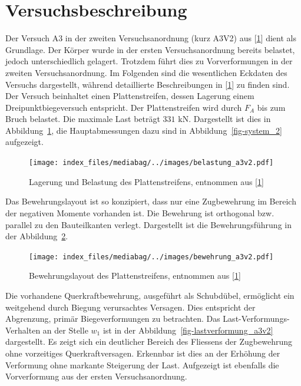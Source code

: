 \documentclass[
  12pt,
  letterpaper,
  egregdoesnotlikesansseriftitles]{scrreprt}
\begin{document}
\hypertarget{versuchsbeschreibung}{%
\section{Versuchsbeschreibung}\label{versuchsbeschreibung}}

Der Versuch A3 in der zweiten Versuchsanordnung (kurz A3V2) aus
{[}\protect\hyperlink{ref-Jaeger2006}{1}{]} dient als Grundlage. Der
Körper wurde in der ersten Versuchsanordnung bereits belastet, jedoch
unterschiedlich gelagert. Trotzdem führt dies zu Vorverformungen in der
zweiten Versuchsanordnung. Im Folgenden sind die wesentlichen Eckdaten
des Versuchs dargestellt, während detaillierte Beschreibungen in
{[}\protect\hyperlink{ref-Jaeger2006}{1}{]} zu finden sind. Der Versuch
beinhaltet einen Plattenstreifen, dessen Lagerung einem
Dreipunktbiegeversuch entspricht. Der Plattenstreifen wird durch \(F_A\)
bis zum Bruch belastet. Die maximale Last beträgt \(331 \text{ kN}\).
Dargestellt ist dies in Abbildung~\ref{fig-lagerung_a3v2}, die
Hauptabmessungen dazu sind in Abbildung~\ref{fig-system_2} aufgezeigt.

\begin{figure}[H]

{\centering \texttt{[image: index\_files/mediabag/../images/belastung\_a3v2.pdf]}

}

\caption{\label{fig-lagerung_a3v2}Lagerung und Belastung des
Plattenstreifens, entnommen aus
{[}\protect\hyperlink{ref-Jaeger2006}{1}{]}}

\end{figure}

Das Bewehrungslayout ist so konzipiert, dass nur eine Zugbewehrung im
Bereich der negativen Momente vorhanden ist. Die Bewehrung ist
orthogonal bzw. parallel zu den Bauteilkanten verlegt. Dargestellt ist
die Bewehrungsführung in der Abbildung~\ref{fig-bewehrung_a3v2}.

\begin{figure}[H]

{\centering \texttt{[image: index\_files/mediabag/../images/bewehrung\_a3v2.pdf]}

}

\caption{\label{fig-bewehrung_a3v2}Bewehrungslayout des
Plattenstreifens, entnommen aus
{[}\protect\hyperlink{ref-Jaeger2006}{1}{]}}

\end{figure}

Die vorhandene Querkraftbewehrung, ausgeführt als Schubdübel, ermöglicht
ein weitgehend durch Biegung verursachtes Versagen. Dies entspricht der
Abgrenzung, primär Biegeverformungen zu betrachten. Das
Last-Verformungs-Verhalten an der Stelle \(w_1\) ist in der
Abbildung~\ref{fig-lastverformung_a3v2} dargestellt. Es zeigt sich ein
deutlicher Bereich des Fliessens der Zugbewehrung ohne vorzeitiges
Querkraftversagen. Erkennbar ist dies an der Erhöhung der Verformung
ohne markante Steigerung der Last. Aufgezeigt ist ebenfalls die
Vorverformung aus der ersten Versuchsanordnung.
\end{document}
